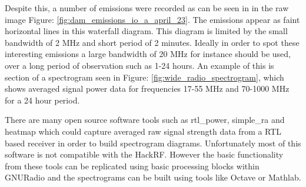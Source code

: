 \documentclass[runningheads,a4paper]{llncs}
\begin{document}
Despite this, a number of emissions were recorded as can be seen in in the raw image Figure: \ref{fig:dam_emissions_io_a_april_23}. The emissions appear as faint horizontal lines in this waterfall diagram. This diagram is limited by the small bandwidth of 2 MHz and short period of 2 minutes. Ideally in order to spot these interesting emissions a large bandwidth of 20 MHz for instance should be used, over a long period of observation such as 1-24 hours. An example of this is section of a spectrogram seen in Figure: \ref{fig:wide_radio_spectrogram}, which shows averaged signal power data for frequencies 17-55 MHz and 70-1000 MHz for a 24 hour period.


There are many open source software tools such as rtl\_power, simple\_ra and heatmap which could capture averaged raw signal strength data from a RTL based receiver in order to build spectrogram diagrams. Unfortunately most of this software is not compatible with the HackRF. However the basic functionality from these tools can be replicated using basic processing blocks within GNURadio and the spectrograms can be built using tools like Octave or Mathlab.
\end{document}
